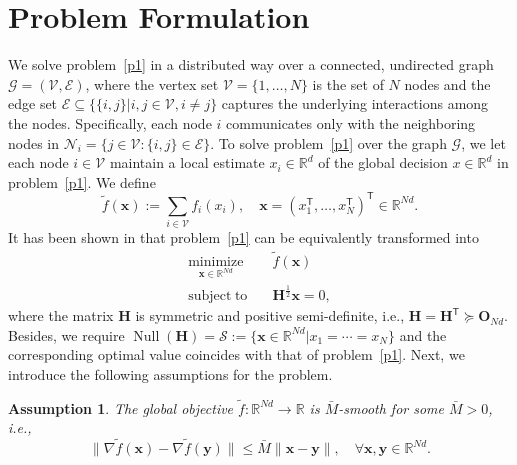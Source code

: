\documentclass[12pt,draftcls,onecolumn]{IEEEtran}
\renewcommand{\Re}{{\mathbb{R}}}
\newcommand{\bH}{{\mathbf{H}}}
\newtheorem{assumption}{Assumption}
\begin{document}
\section{Problem Formulation}\label{section: problem formulation}
We solve problem~\eqref{p1} in a distributed way over a connected, undirected graph $\mathcal{G} = (\mathcal{V},\mathcal{E})$, where the vertex set $\mathcal{V} = \{1, \dots, N\}$ is the set of $N$ nodes and the edge set $\mathcal{E} \subseteq \{\{i,j\}|i,j \in \mathcal{V},i \neq j\}$ captures the underlying interactions among the nodes. Specifically, each node $i$ communicates only with the neighboring nodes in $\mathcal{N}_i=\{j\in\mathcal{V}:\{i,j\}\in\mathcal{E}\}$.
To solve problem~\eqref{p1} over the graph $\mathcal{G}$, we let each node $i \in \mathcal{V}$ maintain a local estimate $x_i \in \mathbb{R}^d$ of the global decision $x \in \mathbb{R}^d$ in problem~\eqref{p1}. We define 
\begin{equation}
\tilde{f}(\mathbf{x}) := \sum _{i \in \mathcal{V}} f_i(x_i),\quad \mathbf{x} = (x_1^{\mathsf{T}}, \dots, x_N^{\mathsf{T}})^{\mathsf{T}} \in \Re ^{Nd}.
\end{equation}
It has been shown in \cite{Mokhtari2016ADS} that problem~\eqref{p1} can be equivalently transformed  into 
\begin{equation}
\begin{aligned}
\underset{\mathbf{x} \in \mathbb{R}^{N d}}{\operatorname{minimize}}\quad & \tilde{f}(\mathbf{x}) \\
\operatorname{subject\;to}\quad & \bH^{\frac{1}{2}} \mathbf{x}=0,
\end{aligned} \label{p2}
\end{equation}
where the matrix ${\bH}$ is symmetric and positive semi-definite, i.e., $\bH = \bH^{\mathsf{T}}\succeq\mathbf{O}_{Nd}$. Besides, we require $\operatorname{Null}(\bH) = \mathcal{S} := \{\mathbf{x} \in \Re ^{Nd}|x_1 = \cdots = x_N\}$ and the corresponding optimal value coincides with that of problem~\eqref{p1}. Next, we introduce the following assumptions for the problem.
\begin{assumption}\label{assumption smooth}
The global objective $\tilde{f}:\Re^{Nd}\rightarrow\Re$ is $\bar{M}$-smooth for some $\bar{M}> 0$, i.e.,
\begin{equation}
\|\nabla \tilde{f}(\mathbf{x}) - \nabla \tilde{f}(\mathbf{y})\|\leq \bar{M}\|\mathbf{x}-\mathbf{y}\|,\quad\forall \mathbf{x},\mathbf{y}\in \Re^{Nd}.\label{smooth}
\end{equation}
\end{assumption}
\end{document}
